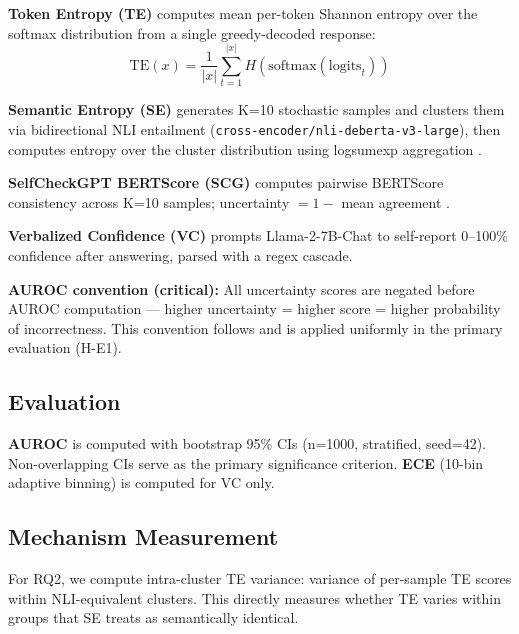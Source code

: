 \textbf{Token Entropy (TE)} computes mean per-token Shannon entropy over the softmax distribution from a single greedy-decoded response:
\begin{equation}
\text{TE}(x) = \frac{1}{|x|} \sum_{t=1}^{|x|} H(\text{softmax}(\text{logits}_t))
\end{equation}

\textbf{Semantic Entropy (SE)} generates K=10 stochastic samples and clusters them via bidirectional NLI entailment (\texttt{cross-encoder/nli-deberta-v3-large}), then computes entropy over the cluster distribution using logsumexp aggregation \citep{Kuhn2023}.

\textbf{SelfCheckGPT BERTScore (SCG)} computes pairwise BERTScore consistency across K=10 samples; uncertainty $= 1 -$ mean agreement \citep{Manakul2023}.

\textbf{Verbalized Confidence (VC)} prompts Llama-2-7B-Chat to self-report 0--100\% confidence after answering, parsed with a regex cascade.

\textbf{AUROC convention (critical):} All uncertainty scores are negated before AUROC computation --- higher uncertainty = higher score = higher probability of incorrectness.
This convention follows \citet{Kuhn2023} and is applied uniformly in the primary evaluation (H-E1).

\subsection{Evaluation}

\textbf{AUROC} is computed with bootstrap 95\% CIs (n=1000, stratified, seed=42).
Non-overlapping CIs serve as the primary significance criterion.
\textbf{ECE} (10-bin adaptive binning) is computed for VC only.

\subsection{Mechanism Measurement}

For RQ2, we compute intra-cluster TE variance: variance of per-sample TE scores within NLI-equivalent clusters.
This directly measures whether TE varies within groups that SE treats as semantically identical.
